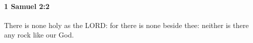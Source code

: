 
		\paragraph{1 Samuel 2:2} %
			\label{1SAMUEL-2-2}

			There is none holy as the LORD: for there is none beside thee: neither is there any rock like our God.


